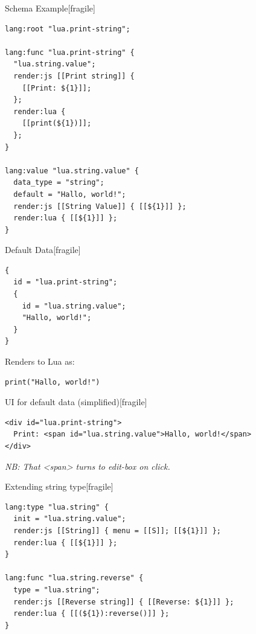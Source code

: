 \documentclass[handout]{beamer}
\begin{document}

\begin{frame}{Schema Example}[fragile]

\begin{verbatim}
lang:root "lua.print-string";

lang:func "lua.print-string" {
  "lua.string.value";
  render:js [[Print string]] {
    [[Print: ${1}]];
  };
  render:lua {
    [[print(${1})]];
  };
}

lang:value "lua.string.value" {
  data_type = "string";
  default = "Hallo, world!";
  render:js [[String Value]] { [[${1}]] };
  render:lua { [[${1}]] };
}
\end{verbatim}

\end{frame}


\begin{frame}{Default Data}[fragile]

\begin{verbatim}
{
  id = "lua.print-string";
  {
    id = "lua.string.value";
    "Hallo, world!";
  }
}
\end{verbatim}

Renders to Lua as:

\begin{verbatim}
print("Hallo, world!")
\end{verbatim}

\end{frame}


\begin{frame}{UI for default data (simplified)}[fragile]

\begin{verbatim}
<div id="lua.print-string">
  Print: <span id="lua.string.value">Hallo, world!</span>
</div>
\end{verbatim}

\textit{NB: That <span> turns to edit-box on click.}

\end{frame}


\begin{frame}{Extending string type}[fragile]

\begin{verbatim}
lang:type "lua.string" {
  init = "lua.string.value";
  render:js [[String]] { menu = [[S]]; [[${1}]] };
  render:lua { [[${1}]] };
}

lang:func "lua.string.reverse" {
  type = "lua.string";
  render:js [[Reverse string]] { [[Reverse: ${1}]] };
  render:lua { [[(${1}):reverse()]] };
}
\end{verbatim}

\end{frame}
\end{document}
